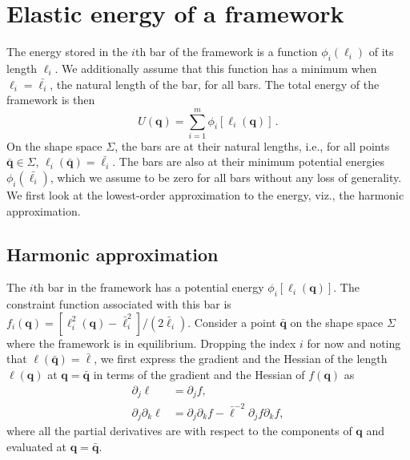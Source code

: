%

\section{Elastic energy of a framework}
\label{sec:energy}

The energy stored in the $i$th bar of the framework is a function $\phi_i(\ell_i)$ of its length $\ell_i$.
We additionally assume that this function has a minimum when $\ell_i = \bar{\ell_i}$, the natural length of the bar, for all bars.
The total energy of the framework is then
%
\begin{equation}
  U({\bm{q}}) = \sum_{i=1}^{m} \phi_i[\ell_i({\bm{q}})]\,.
\end{equation}
%
On the shape space $\Sigma$, the bars are at their natural lengths, i.e., for all points $\bar{\bm{q}} \in \Sigma$, $\ell_i(\bar{\bm{q}}) = \bar{\ell_i}$.
The bars are also at their minimum potential energies $\phi_i(\bar{\ell_i})$, which we assume to be zero for all bars without any loss of generality.
We first look at the lowest-order approximation to the energy, viz., the harmonic approximation.

\subsection{Harmonic approximation}

The $i$th bar in the framework has a potential energy $\phi_i[\ell_i(\bm{q})]$.
The constraint function associated with this bar is $f_i(\bm{q}) = [\ell_i^2(\bm{q}) - \bar{\ell}_i^2]/(2\bar{\ell}_i)$.
Consider a point $\bar{\bm{q}}$ on the shape space $\Sigma$ where the framework is in equilibrium.
Dropping the index $i$ for now and noting that $\ell(\bar{\bm{q}}) = \bar{\ell}$, we first express the gradient and the Hessian of the length $\ell(\bm{q})$ at $\bm{q} = \bar{\bm{q}}$ in terms of the gradient and the Hessian of $f(\bm{q})$ as
%
\begin{equation}
\begin{aligned}
  \partial_j \ell &= \partial_j f,\\
  \partial_j\partial_k \ell &= \partial_j\partial_k f - \bar{\ell}^{-2}\partial_j f\partial_k f,
  \label{sm:eq:lentomap}
\end{aligned}
\end{equation}
%
where all the partial derivatives are with respect to the components of $\bm{q}$ and evaluated at $\bm{q} = \bar{\bm{q}}$.

